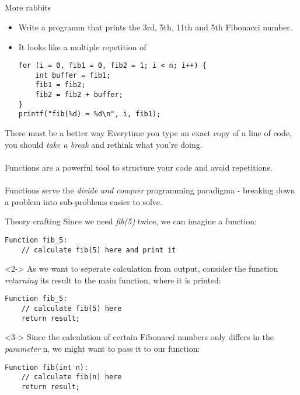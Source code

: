 \subsection{}
\begin{frame}[fragile]{More rabbits}
	\begin{itemize}
		\item Write a programm that prints the 3rd, 5th, 11th and 5th Fibonacci number.
		\item<2-> It looks like a multiple repetition of
		\begin{lstlisting}
for (i = 0, fib1 = 0, fib2 = 1; i < n; i++) {
	int buffer = fib1;
	fib1 = fib2;
	fib2 = fib2 + buffer;
}
printf("fib(%d) = %d\n", i, fib1);
\end{lstlisting}
	\end{itemize}
\end{frame}
\begin{frame}{There must be a better way}
	Everytime you type an exact copy of a line of code, you should \textit{take a break} and rethink what you're doing. \\ \ \\
	Functions are a powerful tool to structure your code and avoid repetitions. \\ \ \\
	Functions serve the \textit{divide and conquer} programming paradigma - breaking down a problem into sub-problems easier to solve.
\end{frame}
\begin{frame}[fragile]{Theory crafting}
	Since we need \textit{fib(5)} twice, we can imagine a function:
	\begin{lstlisting}[numbers=none]
Function fib_5:
	// calculate fib(5) here and print it
\end{lstlisting}
	\begin{uncoverenv}<2->
	As we want to seperate calculation from output, consider the function \textit{returning} its result to the main function, where it is printed:
	\begin{lstlisting}[numbers=none]
Function fib_5:
	// calculate fib(5) here
	return result;
\end{lstlisting}
	\end{uncoverenv}
	\begin{uncoverenv}<3->
	Since the calculation of certain Fibonacci numbers only differs in the \textit{parameter} n, we might want to pass it to our function:
	\begin{lstlisting}[numbers=none]
Function fib(int n):
	// calculate fib(n) here
	return result;
\end{lstlisting}
	\end{uncoverenv}
\end{frame}
